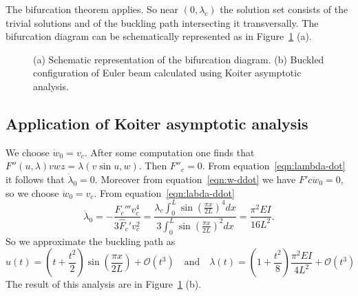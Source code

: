 \documentclass[a4paper,11pt]{article}
\theoremstyle{definition}
\begin{document}
The bifurcation theorem applies. So near $(0,\lambda_c)$ the solution set consists of the trivial solutions and of the buckling path intersecting it transversally. The bifurcation diagram can be schematically represented as in Figure~\ref{fig:euler-beam} (a).

\begin{figure}[t]
\centering
\footnotesize

\qquad\qquad\qquad\qquad
{}

\caption{(a) Schematic representation of the bifurcation diagram. (b) Buckled configuration of Euler beam calculated using Koiter asymptotic analysis.}
\label{fig:euler-beam}
\end{figure}

\subsection{Application of Koiter asymptotic analysis}

We choose $\dot w_0=v_c$. After some computation one finds that $F''(u,\lambda)vwz=\lambda(v\sin u,w)$. Then $F''_c=0$. From equation~\eqref{eqn:lambda-dot} it follows that $\dot\lambda_0=0$. Moreover from equation~\eqref{eqn:w-ddot} we have $F'c\ddot w_0=0$, so we choose $\ddot w_0=v_c$. From equation~\eqref{eqn:labda-ddot}
\[
\ddot\lambda_0=-\frac{F_c'''v_c^4}{3\hat F_c'v_c^2}=\frac{\lambda_c\int_0^L\sin\left(\frac{\pi x}{2L}\right)^4dx}{3\int_0^L\sin\left(\frac{\pi x}{2L}\right)^2dx}=\frac{\pi^2EI}{16L^2}.
\]
So we approximate the buckling path as
\[
u(t)=\left(t+\frac{t^2}{2}\right)\sin\left(\frac{\pi x}{2L}\right)+\mathscr{O}(t^3)\quad\text{and}\quad \lambda(t)=\left(1+\frac{t^2}{8}\right)\frac{\pi^2EI}{4L^2}+\mathscr{O}(t^3)
\]
The result of this analysis are in Figure~\ref{fig:euler-beam} (b).
\end{document}
